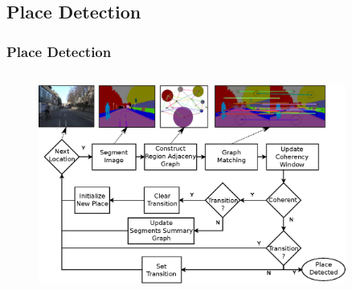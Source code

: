 \subsection{Place Detection}
\frame
{
	\frametitle{Place Detection}
	
	\begin{columns}[t,onlytextwidth]
		\hspace*{-1cm}
		
		\vspace{-0.5cm}
		\begin{figure}[p]
			\centering
			\includegraphics[width = 0.9\textwidth]{img/icsc/diagram}
		\end{figure}
		
	\end{columns}
}